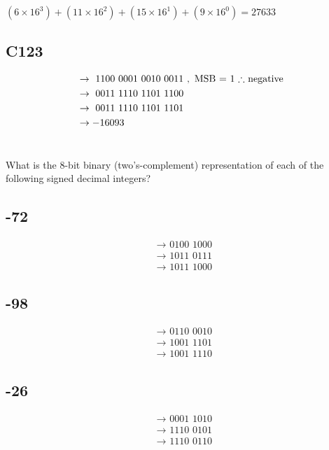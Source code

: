 \documentclass{article}
\begin{document}
$ (6 \times 16^{3}) + (11 \times 16^{2}) + (15 \times 16^{1}) + (9 \times 16^{0}) = 27633 $

\subsection{C123}

\begin{align*}
	& \rightarrow \text{ 1100 0001 0010 0011 }, \text{ MSB = 1 $ \therefore $ negative } \\
	& \rightarrow \text{ 0011 1110 1101 1100 } \\
	& \rightarrow \text{ 0011 1110 1101 1101 } \\
	& \rightarrow -16093
\end{align*}

\section{}
What is the 8-bit binary (two’s-complement) representation of each of the following signed decimal integers?

\subsection{-72}

\begin{align*}
	& \rightarrow \text{ 0100 1000 } \\
	& \rightarrow \text{ 1011 0111 } \\
	& \rightarrow \text{ 1011 1000 }
\end{align*}

\subsection{-98}

\begin{align*}
	& \rightarrow \text{ 0110 0010 } \\
	& \rightarrow \text{ 1001 1101 } \\
	& \rightarrow \text{ 1001 1110 }
\end{align*}

\subsection{-26}

\begin{align*}
	& \rightarrow \text{ 0001 1010 } \\
	& \rightarrow \text{ 1110 0101 } \\
	& \rightarrow \text{ 1110 0110 }
\end{align*}
\end{document}
